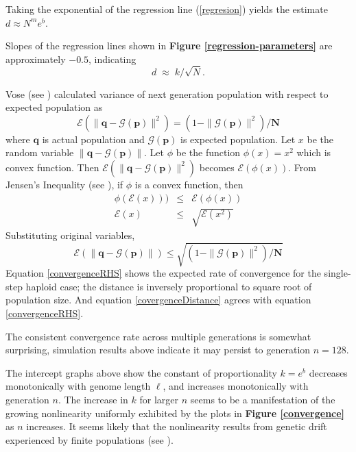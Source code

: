 Taking the exponential of the regression line (\ref{regresion}) yields
the estimate
$d \approx N^m e^b $.

Slopes of the regression lines shown in {\bf Figure \ref{regression-parameters}} are
approximately $-0.5$, indicating
\begin{equation}
\label{covergenceDistance}
d \; \approx \; k/\sqrt{N}.
\end{equation}
 
Vose (see \cite{Vose1999}) calculated variance of next generation population with respect to expected population as 
\[
\mathcal{E}(\| \bm{q} - \mathcal{G}(\bm{p}) \|^2) = (1 - \|\mathcal{G}(\bm{p})\|^2) / \bm{N}
\] 
where $\bm{q}$ is actual population and $\mathcal{G}(\bm{p})$ is expected population.
Let $x$ be the random variable $\| \bm{q} - \mathcal{G}(\bm{p}) \|$. Let $\phi$ be the function $\phi (x) = x^2$ 
which is convex function. Then $\mathcal{E}(\| \bm{q} - \mathcal{G}(\bm{p}) \|^2)$ becomes $\mathcal{E}(\phi (x))$. 
From Jensen's Inequality (see \cite{JensenInequality}),
if $\phi$ is a convex function, then
\begin{eqnarray*}
\phi(\mathcal{E}(x))) & \leq & \mathcal{E}(\phi(x)) \\
\mathcal{E}(x) & \leq & \sqrt{\mathcal{E}(x^2)}
\end{eqnarray*}
Substituting original variables,
\begin{equation}
\label{convergenceRHS}
\mathcal{E}(\| \bm{q} - \mathcal{G}(\bm{p}) \|) \leq \sqrt{(1 - \|\mathcal{G}(\bm{p})\|^2) / \bm{N}}
\end{equation}
Equation \ref{convergenceRHS} shows the expected rate of convergence for the single-step
haploid case; the distance is inversely proportional to square root of population size. 
And equation \ref{covergenceDistance} agrees with  equation \ref{convergenceRHS}.

The consistent convergence rate
across multiple generations is somewhat surprising, simulation
results above indicate it may persist to generation $n = 128$.

The intercept graphs above show the constant of proportionality $k =
e^b$ decreases monotonically with genome length $\ell$, and increases
monotonically with generation $n$.  The increase in $k$ for larger $n$
seems to be a manifestation of the growing nonlinearity uniformly
exhibited by the plots in {\bf Figure \ref{convergence}} as $n$ increases.  It seems
likely that the nonlinearity results from genetic drift experienced by
finite populations (see \cite{CrowKimura}).


